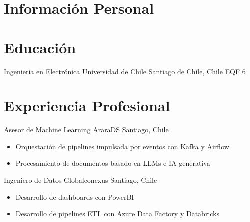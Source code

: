 \documentclass[11pt, a4paper, sans]{moderncv}
\begin{document}
    \pagestyle{empty}


    \vspace*{-10pt}

    \section{Información Personal}

    \section{Educación}
                { Ingeniería en Electrónica }
                { Universidad de Chile }
                { Santiago de Chile, Chile }
                { EQF 6 }
                {
                }

    \section{Experiencia Profesional}

                { Asesor de Machine Learning }
                { AraraDS }
                { Santiago, Chile }
                {}
                {
                \begin{itemize}
                    \item Orquestación de pipelines impulsada por eventos con Kafka y Airflow
                    \item Procesamiento de documentos basado en LLMs e IA generativa
                \end{itemize}
                }

        \vspace{6pt}

                { Ingeniero de Datos }
                { Globalconexus }
                { Santiago, Chile }
                {}
                {
                \begin{itemize}
                    \item Desarrollo de dashboards con PowerBI
                    \item Desarrollo de pipelines ETL con Azure Data Factory y Databricks
                \end{itemize}
                }
\end{document}

